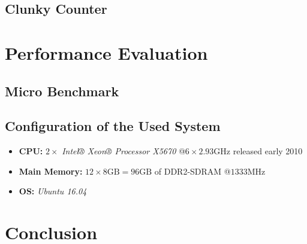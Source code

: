 \subsection[Clunky Counter]{Clunky Counter} \label{subsec:clunky_counter}

\section[Performance Evaluation]{Performance Evaluation} \label{sec:loop-performance}

\subsection[Micro Benchmark]{Micro Benchmark}

\subsection[System Configuration]{Configuration of the Used System}

\begin{@empty}
	\begin{itemize}
		\itemsep0em
		\item	\textbf{CPU:} $2 \times $ \emph{Intel® Xeon® Processor X5670} @$6 \times 2.93\text{GHz}$ released early 2010
		\item	\textbf{Main Memory:} $12 \times 8\text{GB} = 96\text{GB}$ of DDR2-SDRAM @$1333\text{MHz}$
		\item	\textbf{OS:} \emph{Ubuntu 16.04}
	\end{itemize}
\end{@empty}

\section{Conclusion}
